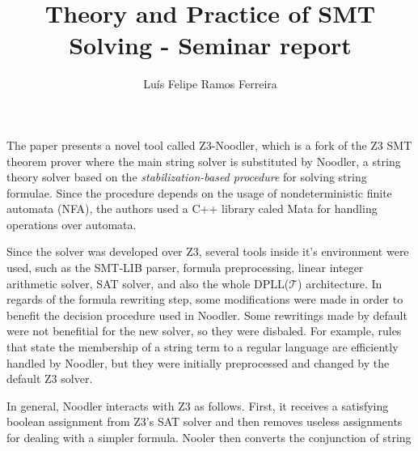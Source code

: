 \documentclass{article}
\title{Theory and Practice of SMT Solving - Seminar report}
\author{Luís Felipe Ramos Ferreira}
\begin{document}
\maketitle

The paper presents a novel tool called Z3-Noodler, which is a fork of the Z3 SMT theorem prover where the main string solver is substituted by
Noodler, a string theory solver based on the \textit{stabilization-based procedure} for solving string formulae. Since the procedure depends on the usage
of nondeterministic finite automata (NFA), the authors used a C++ library caled Mata for handling operations over automata.

Since the solver was developed over Z3, several tools inside it's environment were used, such as the SMT-LIB parser, formula preprocessing, linear integer arithmetic
solver, SAT solver, and also the whole DPLL(\(\mathcal{T}\)) architecture. In regards of the formula rewriting step, some modifications were
made in order to benefit the decision procedure used in Noodler. Some rewritings made by default were not benefitial for the new solver, so they were disbaled.
For example, rules that state the membership of a string term to a regular language are efficiently handled by Noodler, but they were initially preprocessed and changed
by the default Z3 solver.

In general, Noodler interacts with Z3 as follows. First, it receives a satisfying boolean assignment from Z3's SAT solver and then removes
useless assignments for dealing with a simpler formula. Nooler then converts the conjunction of string 
\end{document}
